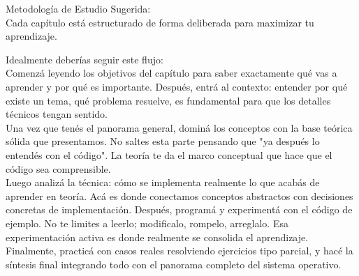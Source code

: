 \begin{minipage}{0.9\textwidth}
  Metodología de Estudio Sugerida:\\
  Cada capítulo está estructurado de forma deliberada para maximizar tu aprendizaje. 

  Idealmente deberías seguir este flujo:\\
  Comenzá leyendo los objetivos del capítulo para saber exactamente qué vas a aprender y por qué es importante. 
  Después, entrá al contexto: entender por qué existe un tema, qué problema resuelve, es fundamental para 
  que los detalles técnicos tengan sentido.\\

  Una vez que tenés el panorama general, dominá los conceptos con la base teórica sólida que presentamos. 
  No saltes esta parte pensando que "ya después lo entendés con el código". La teoría te da el marco conceptual 
  que hace que el código sea comprensible.\\
  
  Luego analizá la técnica: cómo se implementa realmente lo que acabás de aprender en teoría. Acá es donde conectamos 
  conceptos abstractos con decisiones concretas de implementación. Después, programá y experimentá con el código de ejemplo. 
  No te limites a leerlo; modificalo, rompelo, arreglalo. Esa experimentación activa es donde realmente se consolida el aprendizaje.\\
  Finalmente, practicá con casos reales resolviendo ejercicios tipo parcial, y hacé la síntesis final integrando todo con el panorama completo del sistema operativo.
\end{minipage}

\newpage
\thispagestyle{empty}
\null
